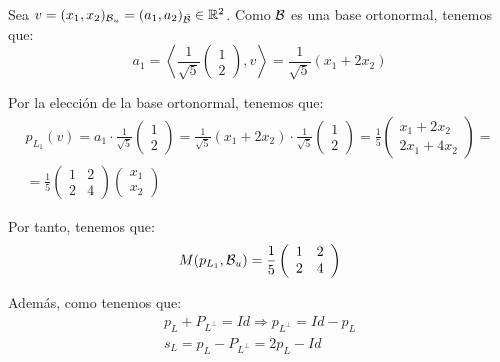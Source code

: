 \begin{ejercicio}
\begin{enumerate}
\begin{enumerate}
        Sea $v=(x_1,x_2)_{\mathcal{B}_u}=(a_1,a_2)_{\bar{\mathcal{B}}}\in \mathbb{R}^2$. Como $\mathcal{B}$ es una base ortonormal, tenemos que:
        \begin{equation*}
            a_1=\left\langle \frac{1}{\sqrt{5}}\left(\begin{array}{c}
             1 \\ 2
        \end{array}\right), v\right\rangle = \frac{1}{\sqrt{5}}(x_1+2x_2)
        \end{equation*}

        Por la elección de la base ortonormal, tenemos que:
        \begin{multline*}
            p_{L_1}(v)=a_1\cdot \frac{1}{\sqrt{5}}\left(\begin{array}{c}
                 1 \\ 2
            \end{array}\right)
            =\frac{1}{\sqrt{5}}(x_1+2x_2) \cdot \frac{1}{\sqrt{5}}\left(\begin{array}{c}
                 1 \\ 2
            \end{array}\right)
            =\frac{1}{5} \left(\begin{array}{c}
                 x_1+2x_2 \\ 2x_1+4x_2
            \end{array}\right)
            =\\=
            \frac{1}{5}\left(\begin{array}{cc}
                1 & 2 \\
                2 & 4
            \end{array}\right)\left(\begin{array}{c}
                 x_1 \\ x_2
            \end{array}\right)
        \end{multline*}

        Por tanto, tenemos que:
        \begin{equation*}
            M(p_{L_1},\mathcal{B}_u) = \frac{1}{5}\left(\begin{array}{cc}
                1 & 2 \\
                2 & 4
            \end{array}\right)
        \end{equation*}

        Además, como tenemos que:
        \begin{gather*}
            p_L +P_{L^\perp} = Id \Longrightarrow p_{L^\perp} = Id -p_L\\
            s_L = p_L - P_{L^\perp} = 2p_L -Id
        \end{gather*}


\end{enumerate}
\end{enumerate}
\end{ejercicio}
